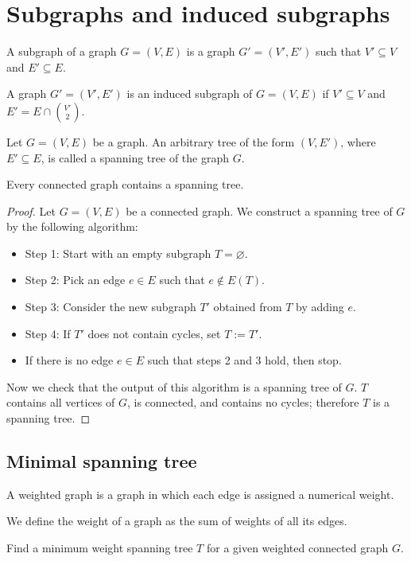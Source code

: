 \section{Subgraphs and induced subgraphs}

\begin{definition}
A subgraph of a graph $G=(V,E)$ is a graph $G'=(V',E')$ such that $V'\subseteq V$ and $E'\subseteq E$.
\end{definition}
\begin{definition}
A graph $G'=(V',E')$ is an induced subgraph of $G=(V,E)$ if $V'\subseteq V$ and $E'=E\cap \binom{ V'}  {2 }$.
\end{definition}
\begin{definition}
Let $G=(V,E)$ be a graph. An arbitrary tree of the form $(V,E')$, where $E'\subseteq E$, is called a spanning tree of the graph $G$.
\end{definition}
\begin{lemma}
Every connected graph contains a spanning tree.
\end{lemma}
\begin{proof}
Let $G=(V,E)$ be a connected graph. We construct a spanning tree of $G$ by the following algorithm:
\begin{itemize}
\item Step 1: Start with an empty subgraph $T=\varnothing$.
\item Step 2: Pick an edge $e\in E$ such that $e\not\in E(T)$.
\item Step 3: Consider the new subgraph $T'$ obtained from $T$ by adding $e$.
\item Step 4: If $T'$ does not contain cycles, set $T:=T'$.
\item If there is no edge $e\in E$ such that steps 2 and 3 hold, then stop.
\end{itemize}
Now we check that the output of this algorithm is a spanning tree of $G$. $T$ contains all vertices of $G$, is connected, and contains no cycles; therefore $T$ is a spanning tree.
\end{proof}
\subsection{Minimal spanning tree}
\begin{definition}
A weighted graph is a graph in which each edge is assigned a numerical weight.
\end{definition}
\begin{definition}
We define the weight of a graph as the sum of weights of all its edges.
\end{definition}
\begin{problem}
Find a minimum weight spanning tree $T$ for a given weighted connected graph $G$.
\end{problem}

